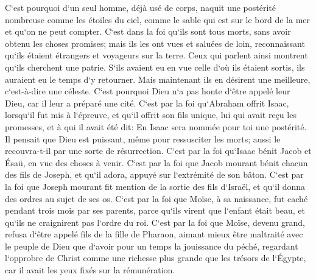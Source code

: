 \verse C`est pourquoi d`un seul homme, déjà usé de corps, naquit une postérité nombreuse comme les étoiles du ciel, comme le sable qui est sur le bord de la mer et qu`on ne peut compter. 
\verse C`est dans la foi qu`ils sont tous morts, sans avoir obtenu les choses promises; mais ils les ont vues et saluées de loin, reconnaissant qu`ils étaient étrangers et voyageurs sur la terre. 
\verse Ceux qui parlent ainsi montrent qu`ils cherchent une patrie. 
\verse S`ils avaient eu en vue celle d`où ils étaient sortis, ils auraient eu le temps d`y retourner. 
\verse Mais maintenant ils en désirent une meilleure, c`est-à-dire une céleste. C`est pourquoi Dieu n`a pas honte d`être appelé leur Dieu, car il leur a préparé une cité. 
\verse C`est par la foi qu`Abraham offrit Isaac, lorsqu`il fut mis à l`épreuve, et qu`il offrit son fils unique, lui qui avait reçu les promesses, 
\verse et à qui il avait été dit: En Isaac sera nommée pour toi une postérité. 
\verse Il pensait que Dieu est puissant, même pour ressusciter les morts; aussi le recouvra-t-il par une sorte de résurrection. 
\verse C`est par la foi qu`Isaac bénit Jacob et Ésaü, en vue des choses à venir. 
\verse C`est par la foi que Jacob mourant bénit chacun des fils de Joseph, et qu`il adora, appuyé sur l`extrémité de son bâton. 
\verse C`est par la foi que Joseph mourant fit mention de la sortie des fils d`Israël, et qu`il donna des ordres au sujet de ses os. 
\verse C`est par la foi que Moïse, à sa naissance, fut caché pendant trois mois par ses parents, parce qu`ils virent que l`enfant était beau, et qu`ils ne craignirent pas l`ordre du roi. 
\verse C`est par la foi que Moïse, devenu grand, refusa d`être appelé fils de la fille de Pharaon, 
\verse aimant mieux être maltraité avec le peuple de Dieu que d`avoir pour un temps la jouissance du péché, 
\verse regardant l`opprobre de Christ comme une richesse plus grande que les trésors de l`Égypte, car il avait les yeux fixés sur la rémunération. 
